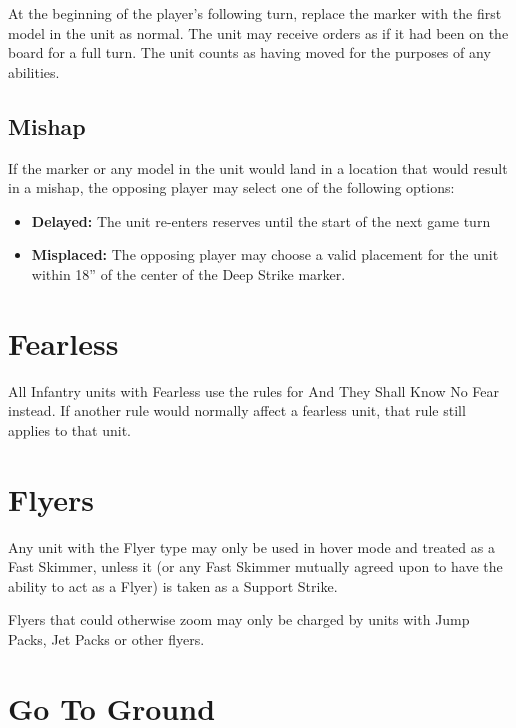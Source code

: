 \documentclass[letterpaper,twocolumn,oneside,titlepage]{book}
\providecommand{\tightlist}{%
  \setlength{\itemsep}{0pt}\setlength{\parskip}{0pt}}
\begin{document}
At the beginning of the player's following turn, replace the marker with
the first model in the unit as normal. The unit may receive orders as if
it had been on the board for a full turn. The unit counts as having
moved for the purposes of any abilities.

\subsection{\texorpdfstring{\textbf{Mishap}}{Mishap}}\label{mishap}

If the marker or any model in the unit would land in a location that
would result in a mishap, the opposing player may select one of the
following options:

\begin{itemize}
\tightlist
\item
  \textbf{Delayed:} The unit re-enters reserves until the start of the
  next game turn\\
\item
  \textbf{Misplaced:} The opposing player may choose a valid placement
  for the unit within 18'' of the center of the Deep Strike marker.
\end{itemize}

\section{\texorpdfstring{\textbf{Fearless}}{Fearless}}\label{fearless}

All Infantry units with Fearless use the rules for And They Shall Know No
Fear instead. If another rule would normally affect a fearless unit,
that rule still applies to that unit.

\section{\texorpdfstring{\textbf{Flyers}}{Flyers}}\label{flyers}

Any unit with the Flyer type may only be used in hover mode and treated
as a Fast Skimmer, unless it (or any Fast Skimmer mutually agreed upon
to have the ability to act as a Flyer) is taken as a Support Strike.

Flyers that could otherwise zoom may only be charged by units with Jump
Packs, Jet Packs or other flyers.

\section{\texorpdfstring{\textbf{Go To
Ground}}{Go To Ground}}\label{go-to-ground}
\end{document}
